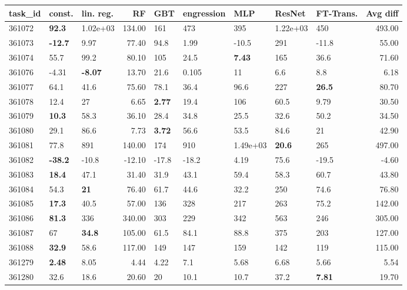 \begin{table}[ht!]
\centering
\begingroup\footnotesize
\begin{tabular}{lllrlllllr}
  \hline
\hline
task\_id & const. & lin. reg. & RF & GBT & engression & MLP & ResNet & FT-Trans. & Avg diff \\ 
  \hline
361072 & \textbf{92.3} & 1.02e+03 & 134.00 & 161 & 473 & 395 & 1.22e+03 & 450 & 493.00 \\ 
  361073 & \textbf{-12.7} & 9.97 & 77.40 & 94.8 & 1.99 & -10.5 & 291 & -11.8 & 55.00 \\ 
  361074 & 55.7 & 99.2 & 80.10 & 105 & 24.5 & \textbf{7.43} & 165 & 36.6 & 71.60 \\ 
  361076 & -4.31 & \textbf{-8.07} & 13.70 & 21.6 & 0.105 & 11 & 6.6 & 8.8 & 6.18 \\ 
  361077 & 64.1 & 41.6 & 75.60 & 78.1 & 36.4 & 96.6 & 227 & \textbf{26.5} & 80.70 \\ 
  361078 & 12.4 & 27 & 6.65 & \textbf{2.77} & 19.4 & 106 & 60.5 & 9.79 & 30.50 \\ 
  361079 & \textbf{10.3} & 58.3 & 36.10 & 28.4 & 34.8 & 25.5 & 32.6 & 50.2 & 34.50 \\ 
  361080 & 29.1 & 86.6 & 7.73 & \textbf{3.72} & 56.6 & 53.5 & 84.6 & 21 & 42.90 \\ 
  361081 & 77.8 & 891 & 140.00 & 174 & 910 & 1.49e+03 & \textbf{20.6} & 265 & 497.00 \\ 
  361082 & \textbf{-38.2} & -10.8 & -12.10 & -17.8 & -18.2 & 4.19 & 75.6 & -19.5 & -4.60 \\ 
  361083 & \textbf{18.4} & 47.1 & 31.40 & 31.9 & 43.1 & 59.4 & 58.3 & 60.7 & 43.80 \\ 
  361084 & 54.3 & \textbf{21} & 76.40 & 61.7 & 44.6 & 32.2 & 250 & 74.6 & 76.80 \\ 
  361085 & \textbf{17.3} & 40.5 & 57.00 & 136 & 328 & 217 & 263 & 75.2 & 142.00 \\ 
  361086 & \textbf{81.3} & 336 & 340.00 & 303 & 229 & 342 & 563 & 246 & 305.00 \\ 
  361087 & 67 & \textbf{34.8} & 105.00 & 61.5 & 84.1 & 88.8 & 375 & 203 & 127.00 \\ 
  361088 & \textbf{32.9} & 58.6 & 117.00 & 149 & 147 & 159 & 142 & 119 & 115.00 \\ 
  361279 & \textbf{2.48} & 8.05 & 4.44 & 4.22 & 7.1 & 5.68 & 6.68 & 5.66 & 5.54 \\ 
  361280 & 32.6 & 18.6 & 20.60 & 20 & 10.1 & 10.7 & 37.2 & \textbf{7.81} & 19.70 \\ 

\end{tabular}
\end{table}
